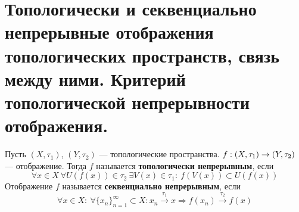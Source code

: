 \newpage
\section{Топологически и секвенциально непрерывные отображения топологических пространств, связь между ними. Критерий топологической непрерывности отображения.}

\begin{definition}
	Пусть $(X, \tau_1)$, $(Y, \tau_2)$ --- топологические пространства. $f: (X,\tau_1) \rightarrow (Y, \tau_2)$ --- отображение. Тогда $f$ называется \textbf{топологически непрерывным}, если 
	$$
	\forall x \in X \ \forall U(f(x)) \in \tau_2 \ \exists V(x) \in \tau_1: \ f(V(x)) \subset U(f(x))
	$$
	Отображение $f$ называется \textbf{секвенциально непрерывным}, если
	$$
	\forall x \in X: \ \forall \{x_n\}_{n=1}^{\infty} \subset X: x_n \xrightarrow{\tau_1} x \Rightarrow f(x_n) \xrightarrow{\tau_2}f(x)
	$$
\end{definition}

